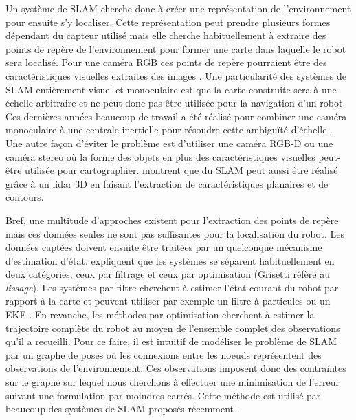Un système de SLAM cherche donc à créer une représentation de l'environnement pour ensuite s'y localiser. Cette représentation peut prendre plusieurs formes dépendant du capteur utilisé mais elle cherche habituellement à extraire des points de repère de l'environnement pour former une carte dans laquelle le robot sera localisé. Pour une caméra RGB ces points de repère pourraient être des caractéristiques visuelles extraites des images \citep{Mur-Artal2017}. Une particularité des systèmes de SLAM entièrement visuel et monoculaire est que la carte construite sera à une échelle arbitraire et ne peut donc pas être utilisée pour la navigation d'un robot. Ces dernières années beaucoup de travail a été réalisé pour combiner une caméra monoculaire à une centrale inertielle pour résoudre cette ambiguïté d'échelle \citep{muratal2017vimonoslam}. Une autre façon d'éviter le problème est d'utiliser une caméra RGB-D ou une caméra stereo où la forme des objets en plus des caractéristiques visuelles peut-être utilisée \citep{henry2014rgb} pour cartographier. \cite{Zhang2017} montrent que du SLAM peut aussi être réalisé grâce à un lidar 3D en faisant l'extraction de caractéristiques planaires et de contours.

Bref, une multitude d'approches existent pour l'extraction des points de repère mais ces données seules ne sont pas suffisantes pour la localisation du robot. Les données captées doivent ensuite être traitées par un quelconque mécanisme d'estimation d'état. \cite{Grisetti2010} expliquent que les systèmes se séparent habituellement en deux catégories, ceux par filtrage et ceux par optimisation (Grisetti réfère au \textit{lissage}). Les systèmes par filtre cherchent à estimer l'état courant du robot par rapport à la carte et peuvent utiliser par exemple un filtre à particules \citep{Grisetti2007} ou un EKF \citep{Montemerlo03a}. En revanche, les méthodes par optimisation cherchent à estimer la trajectoire complète du robot au moyen de l'ensemble complet des observations qu'il a recueilli. Pour ce faire, il est intuitif de modéliser le problème de SLAM par un graphe de poses où les connexions entre les noeuds représentent des observations de l'environnement. Ces observations imposent donc des contraintes sur le graphe sur lequel nous cherchons à effectuer une minimisation de l'erreur suivant une formulation par moindres carrés. Cette méthode est utilisé par beaucoup des systèmes de SLAM proposés récemment \citep{Labbe2014, Hess2016}.


